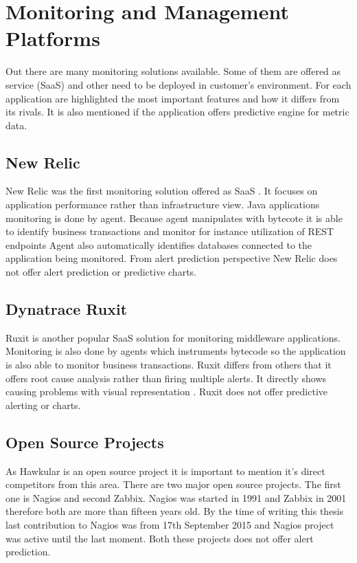     \section{Monitoring and Management Platforms}
    Out there are many monitoring solutions available. Some of them are offered as service (SaaS) and other need to be
    deployed in customer's environment. For each application are highlighted the most important features and how it
    differs from its rivals. It is also mentioned if the application offers predictive engine for metric data.

    \subsection{New Relic}
    New Relic was the first monitoring solution offered as SaaS \cite{new-relic}. It focuses on application performance
    rather than infrastructure view. Java applications monitoring is done by agent. Because agent manipulates
    with bytecote it is able to identify business transactions and monitor for instance utilization of REST endpoints
    Agent also automatically identifies databases connected to the application being monitored. From alert
    prediction perspective New Relic does not offer alert prediction or predictive charts.

    \subsection{Dynatrace Ruxit}
    Ruxit is another popular SaaS solution for monitoring middleware applications. Monitoring is also done by agents
    which instruments bytecode so the application is also able to monitor business transactions. Ruxit differs from
    others that it offers root cause analysis rather than firing multiple alerts. It directly shows causing problems
    with visual representation \cite{ruxit}. Ruxit does not offer predictive alerting or charts.

    \subsection{Open Source Projects}
    As Hawkular is an open source project it is important to mention it's direct competitors from this area. There are
    two major open source projects. The first one is Nagios and second Zabbix. Nagios was started in 1991 and Zabbix
    in 2001 therefore both are more than fifteen years old. By the time of writing this thesis last contribution to
    Nagios was from 17th September 2015 and Nagios project was active until the last moment. Both these projects does
    not offer alert prediction.

